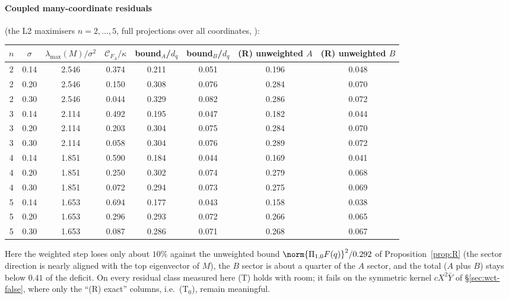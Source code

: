 \paragraph{Coupled many-coordinate residuals} (the L2 maximisers $n=2,\dots,5$, full projections over all coordinates, ):
\begin{center}\small
\begin{tabular}{cc|cc|cc|cc}\toprule
$n$ & $\sigma$ & $\lambda_{\max}(M)/\sigma^2$ & $\mathcal C_{F_A}/\kappa$ & bound$_A$/$d_q$ & bound$_B$/$d_q$ & (R) unweighted $A$ & (R) unweighted $B$\\\midrule
2 & 0.14 & 2.546 & 0.374 & 0.211 & 0.051 & 0.196 & 0.048\\
2 & 0.20 & 2.546 & 0.150 & 0.308 & 0.076 & 0.284 & 0.070\\
2 & 0.30 & 2.546 & 0.044 & 0.329 & 0.082 & 0.286 & 0.072\\
3 & 0.14 & 2.114 & 0.492 & 0.195 & 0.047 & 0.182 & 0.044\\
3 & 0.20 & 2.114 & 0.203 & 0.304 & 0.075 & 0.284 & 0.070\\
3 & 0.30 & 2.114 & 0.058 & 0.304 & 0.076 & 0.289 & 0.072\\
4 & 0.14 & 1.851 & 0.590 & 0.184 & 0.044 & 0.169 & 0.041\\
4 & 0.20 & 1.851 & 0.250 & 0.302 & 0.074 & 0.279 & 0.068\\
4 & 0.30 & 1.851 & 0.072 & 0.294 & 0.073 & 0.275 & 0.069\\
5 & 0.14 & 1.653 & 0.694 & 0.177 & 0.043 & 0.158 & 0.038\\
5 & 0.20 & 1.653 & 0.296 & 0.293 & 0.072 & 0.266 & 0.065\\
5 & 0.30 & 1.653 & 0.087 & 0.286 & 0.071 & 0.268 & 0.067\\
\bottomrule
\end{tabular}
\end{center}
Here the weighted step loses only about $10\%$ against the unweighted bound $\norm{\Pi_{1,0}F(q)}^2/0.292$ of Proposition~\ref{prop:R} (the sector direction is nearly aligned with the top
eigenvector of $M$), the $B$ sector is about a quarter of the $A$ sector, and the total ($A$ plus $B$) stays below $0.41$ of the deficit. On every residual class measured here (T) holds with room; it fails on the symmetric kernel $cX^2\bar Y$ of \S\ref{sec:wct-false}, where only the ``(R) exact'' columns, i.e.\ (T$_0$), remain meaningful.

